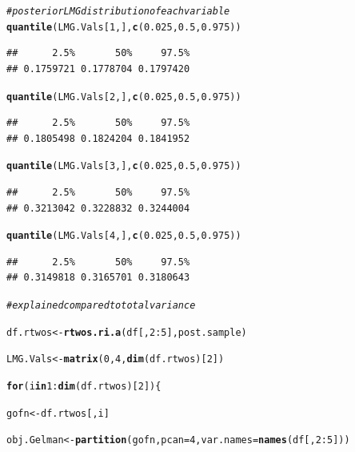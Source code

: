 \documentclass[11pt,a4paper,twoside]{book}\usepackage[]{graphicx}\usepackage[]{color}
\makeatletter
\newcommand{\hlnum}[1]{\textcolor[rgb]{0.686,0.059,0.569}{#1}}%
\newcommand{\hlcom}[1]{\textcolor[rgb]{0.678,0.584,0.686}{\textit{#1}}}%
\newcommand{\hlopt}[1]{\textcolor[rgb]{0,0,0}{#1}}%
\newcommand{\hlstd}[1]{\textcolor[rgb]{0.345,0.345,0.345}{#1}}%
\newcommand{\hlkwa}[1]{\textcolor[rgb]{0.161,0.373,0.58}{\textbf{#1}}}%
\newcommand{\hlkwb}[1]{\textcolor[rgb]{0.69,0.353,0.396}{#1}}%
\newcommand{\hlkwc}[1]{\textcolor[rgb]{0.333,0.667,0.333}{#1}}%
\newcommand{\hlkwd}[1]{\textcolor[rgb]{0.737,0.353,0.396}{\textbf{#1}}}%
\newenvironment{kframe}{%
 \def\at@end@of@kframe{}%
 \ifinner\ifhmode%
  \def\at@end@of@kframe{\end{minipage}}%
  \begin{minipage}{\columnwidth}%
 \fi\fi%
 \def\FrameCommand##1{\hskip\@totalleftmargin \hskip-\fboxsep
 \colorbox{shadecolor}{##1}\hskip-\fboxsep
     \hskip-\linewidth \hskip-\@totalleftmargin \hskip\columnwidth}%
 \MakeFramed {\advance\hsize-\width
   \@totalleftmargin\z@ \linewidth\hsize
   \@setminipage}}%
 {\par\unskip\endMakeFramed%
 \at@end@of@kframe}
\newenvironment{knitrout}{}{} %
\makeatother
\begin{document}
\begin{knitrout}
\begin{kframe}
\begin{alltt}
\hlcom{# posterior LMG distribution of each variable}
\hlkwd{quantile}\hlstd{(LMG.Vals[}\hlnum{1}\hlstd{,],} \hlkwd{c}\hlstd{(}\hlnum{0.025}\hlstd{,} \hlnum{0.5}\hlstd{,} \hlnum{0.975}\hlstd{))}
\end{alltt}
\begin{verbatim}
##      2.5%       50%     97.5% 
## 0.1759721 0.1778704 0.1797420
\end{verbatim}
\begin{alltt}
\hlkwd{quantile}\hlstd{(LMG.Vals[}\hlnum{2}\hlstd{,],} \hlkwd{c}\hlstd{(}\hlnum{0.025}\hlstd{,} \hlnum{0.5}\hlstd{,} \hlnum{0.975}\hlstd{))}
\end{alltt}
\begin{verbatim}
##      2.5%       50%     97.5% 
## 0.1805498 0.1824204 0.1841952
\end{verbatim}
\begin{alltt}
\hlkwd{quantile}\hlstd{(LMG.Vals[}\hlnum{3}\hlstd{,],} \hlkwd{c}\hlstd{(}\hlnum{0.025}\hlstd{,} \hlnum{0.5}\hlstd{,} \hlnum{0.975}\hlstd{))}
\end{alltt}
\begin{verbatim}
##      2.5%       50%     97.5% 
## 0.3213042 0.3228832 0.3244004
\end{verbatim}
\begin{alltt}
\hlkwd{quantile}\hlstd{(LMG.Vals[}\hlnum{4}\hlstd{,],} \hlkwd{c}\hlstd{(}\hlnum{0.025}\hlstd{,} \hlnum{0.5}\hlstd{,} \hlnum{0.975}\hlstd{))}
\end{alltt}
\begin{verbatim}
##      2.5%       50%     97.5% 
## 0.3149818 0.3165701 0.3180643
\end{verbatim}
\begin{alltt}
\hlcom{# explained compared to total variance}

\hlstd{df.rtwos} \hlkwb{<-} \hlkwd{rtwos.ri.a}\hlstd{(df[,}\hlnum{2}\hlopt{:}\hlnum{5}\hlstd{], post.sample)}

\hlstd{LMG.Vals}\hlkwb{<-}\hlkwd{matrix}\hlstd{(}\hlnum{0}\hlstd{,} \hlnum{4}\hlstd{,} \hlkwd{dim}\hlstd{(df.rtwos)[}\hlnum{2}\hlstd{])}

\hlkwa{for}\hlstd{(i} \hlkwa{in} \hlnum{1}\hlopt{:}\hlkwd{dim}\hlstd{(df.rtwos)[}\hlnum{2}\hlstd{])\{}

        \hlstd{gofn}\hlkwb{<-}\hlstd{df.rtwos[,i]}

        \hlstd{obj.Gelman}\hlkwb{<-}\hlkwd{partition}\hlstd{(gofn,} \hlkwc{pcan} \hlstd{=} \hlnum{4}\hlstd{,} \hlkwc{var.names} \hlstd{=} \hlkwd{names}\hlstd{(df[,}\hlnum{2}\hlopt{:}\hlnum{5}\hlstd{]))}


\end{alltt}
\end{kframe}
\end{knitrout}
\end{document}
